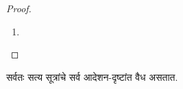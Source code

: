 \begin{proof}
\begin{enumerate}
{\begin{align*}
        &\qquad \text{$\pSat{v}{}$ च्या व्याख्येवरून}\\
        \Leftrightarrow{} &
        \mSat/{M}{\SSubst{\psi}{\subst{\theta_1}{p_1}, \dots,
            \subst{\theta_n}{p_n}}}[w] \text{ किंवा }\\
        & \mSat{M}{\SSubst{\chi}{\subst{\theta_1}{p_1}, \dots,
          \subst{\theta_n}{p_n}}}[w]\\
        &\qquad \text{विगमन गृहीतकावरून}\\
        \Leftrightarrow{} &
        \mSat{M}{\SSubst{(\psi \lif \chi)}{\subst{\theta_1}{p_1}, \dots,
          \subst{\theta_n}{p_n}}}[w]\\
        &\qquad \text{$\mSat{M}{}[w]$ च्या व्याख्येवरून}.
      \end{align*}}
  \item {}
  \end{enumerate}
  \end{proof}

\begin{prop}\label{nml:syn:tau:prop:valid-taut}
  सर्वतः सत्य सूत्रांचे सर्व आदेशन-दृष्टांत वैध असतात.
\end{prop}

